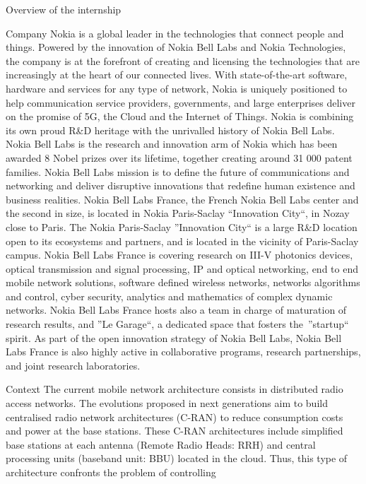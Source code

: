 \documentclass[a4paper,10pt]{report}
\begin{document}
\begin{chapter}{Overview of the internship}
\begin{section}{Company}
Nokia is a global leader in the technologies that connect people and things. Powered by the innovation of Nokia Bell Labs and Nokia Technologies, the company is at the forefront of creating and licensing the technologies that are increasingly at the heart of our connected lives. With state-of-the-art software, hardware and services for any type of network, Nokia is uniquely positioned to help communication service providers, governments, and large enterprises deliver on the promise of 5G, the Cloud and the Internet of Things. Nokia is combining its own proud R\&D heritage with the unrivalled history of Nokia Bell Labs. Nokia Bell Labs is the research and innovation arm of Nokia which has been awarded 8 Nobel prizes over its lifetime, together creating around 31 000 patent families. Nokia Bell Labs mission is to define the future of communications and networking and deliver disruptive innovations that redefine human existence and business realities.
Nokia Bell Labs France, the French Nokia Bell Labs center and the second in size, is located in Nokia Paris-Saclay ``Innovation City``, in Nozay close to Paris. The Nokia Paris-Saclay ''Innovation City`` is a large R\&D location open to its ecosystems and partners, and is located in the vicinity of Paris-Saclay campus. Nokia Bell Labs France is covering research on III-V photonics devices, optical transmission and signal processing, IP and optical networking, end to end mobile network solutions, software defined wireless networks, networks algorithms and control, cyber security, analytics and mathematics of complex dynamic networks. Nokia Bell Labs France hosts also a team in charge of maturation of research results, and ''Le Garage``, a dedicated space that fosters the ''startup`` spirit. As part of the open innovation strategy of Nokia Bell Labs, Nokia Bell Labs France is also highly active in collaborative programs, research partnerships, and joint research laboratories.
\end{section}
\begin{section}{Context}
The current mobile network architecture consists in distributed radio access networks.
The evolutions proposed in next generations aim to build centralised radio network architectures (C-RAN) to reduce consumption costs 
and power at the base stations. These C-RAN architectures include simplified base stations at each antenna (Remote Radio Heads: RRH) 
and central processing units (baseband unit: BBU) located in the cloud. Thus, this type of architecture confronts the problem of controlling 

\end{section}
\end{chapter}
\end{document}

